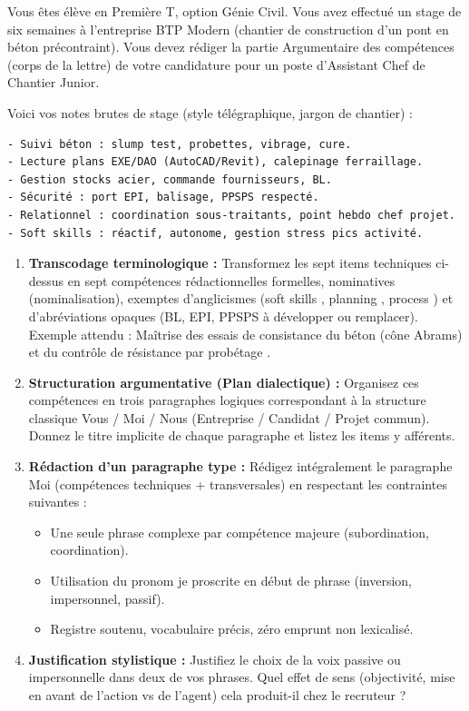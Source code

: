 \documentclass[11pt]{article}
\begin{document}
\begin{exercice}
Vous êtes élève en Première T, option Génie Civil. Vous avez effectué un stage de six semaines à l'entreprise \og BTP Modern \fg{} (chantier de construction d'un pont en béton précontraint). Vous devez rédiger la partie \og Argumentaire des compétences \fg{} (corps de la lettre) de votre candidature pour un poste d'Assistant Chef de Chantier Junior.

Voici vos notes brutes de stage (style télégraphique, jargon de chantier) :
\begin{verbatim}
- Suivi béton : slump test, probettes, vibrage, cure.
- Lecture plans EXE/DAO (AutoCAD/Revit), calepinage ferraillage.
- Gestion stocks acier, commande fournisseurs, BL.
- Sécurité : port EPI, balisage, PPSPS respecté.
- Relationnel : coordination sous-traitants, point hebdo chef projet.
- Soft skills : réactif, autonome, gestion stress pics activité.
\end{verbatim}

\begin{enumerate}
    \item \textbf{Transcodage terminologique :} Transformez les sept items techniques ci-dessus en sept compétences rédactionnelles formelles, nominatives (nominalisation), exemptes d'anglicismes (\og soft skills \fg{}, \og planning \fg{}, \og process \fg{}) et d'abréviations opaques (BL, EPI, PPSPS à développer ou remplacer). Exemple attendu : \og Maîtrise des essais de consistance du béton (cône Abrams) et du contrôle de résistance par probétage \fg{}.
    \item \textbf{Structuration argumentative (Plan dialectique) :} Organisez ces compétences en trois paragraphes logiques correspondant à la structure classique \og Vous / Moi / Nous \fg{} (Entreprise / Candidat / Projet commun). Donnez le titre implicite de chaque paragraphe et listez les items y afférents.
    \item \textbf{Rédaction d'un paragraphe type :} Rédigez intégralement le paragraphe \og Moi \fg{} (compétences techniques + transversales) en respectant les contraintes suivantes : 
    \begin{itemize}
        \item Une seule phrase complexe par compétence majeure (subordination, coordination).
        \item Utilisation du pronom \og je \fg{} proscrite en début de phrase (inversion, impersonnel, passif).
        \item Registre soutenu, vocabulaire précis, zéro emprunt non lexicalisé.
    \end{itemize}
    \item \textbf{Justification stylistique :} Justifiez le choix de la voix passive ou impersonnelle dans deux de vos phrases. Quel effet de sens (objectivité, mise en avant de l'action vs de l'agent) cela produit-il chez le recruteur ?
\end{enumerate}
\end{exercice}
\end{document}
